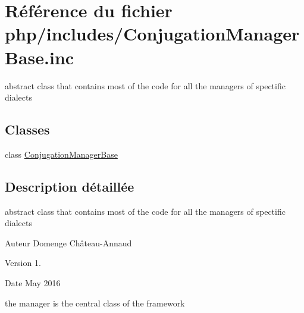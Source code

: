 \hypertarget{_conjugation_manager_base_8inc}{}\section{Référence du fichier php/includes/\+Conjugation\+Manager\+Base.inc}
\label{_conjugation_manager_base_8inc}


abstract class that contains most of the code for all the managers of spectific dialects  


\subsection*{Classes}
\begin{DoxyCompactItemize}
\item 
class \hyperlink{class_conjugation_manager_base}{Conjugation\+Manager\+Base}
\end{DoxyCompactItemize}


\subsection{Description détaillée}
abstract class that contains most of the code for all the managers of spectific dialects 

\begin{DoxyAuthor}{Auteur}
Domenge Château-\/\+Annaud 
\end{DoxyAuthor}
\begin{DoxyVersion}{Version}
1. 
\end{DoxyVersion}
\begin{DoxyDate}{Date}
May 2016
\end{DoxyDate}
the manager is the central class of the framework 
